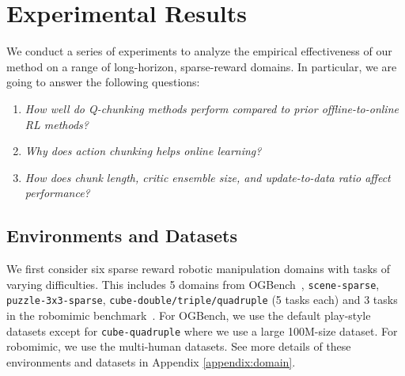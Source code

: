 













\section{Experimental Results}
\label{sec:results}
We conduct a series of experiments to analyze the empirical effectiveness of our method on a range of long-horizon, sparse-reward domains. In particular, we are going to answer the following questions:
\begin{enumerate}[start=1,label={(\bfseries Q\arabic*)}]
    \item \emph{How well do Q-chunking methods perform compared to prior offline-to-online RL methods?}
    \item \emph{Why does action chunking helps online learning?}
    \item \emph{How does chunk length, critic ensemble size, and update-to-data ratio affect performance?}
\end{enumerate}

\subsection{Environments and Datasets}
We first consider six sparse reward robotic manipulation domains with tasks of varying difficulties. This includes 5 domains from OGBench~\citep{ogbench_park2024}, \texttt{scene-sparse}, \texttt{puzzle-3x3-sparse}, \texttt{cube-double/triple/quadruple} (5 tasks each) and 3 tasks in the robomimic benchmark~\citep{robomimic2021}. For OGBench, we use the default play-style datasets except for \texttt{cube-quadruple} where we use a large 100M-size dataset. For robomimic, we use the multi-human datasets. See more details of these environments and datasets in Appendix \ref{appendix:domain}.






